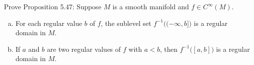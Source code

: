 Prove Proposition 5.47: Suppose $M$ is a smooth manifold and $f \in C^\infty(M)$.

\begin{enumerate}[a)]
\item For each regular value $b$ of $f$, the sublevel set $f^{-1}\big((-\infty,b]\big)$ is a regular domain in $M$.
\item If $a$ and $b$ are two regular values of $f$ with $a<b$, then $f^{-1}\big([a,b]\big)$ is a regular domain in $M$.
\end{enumerate}